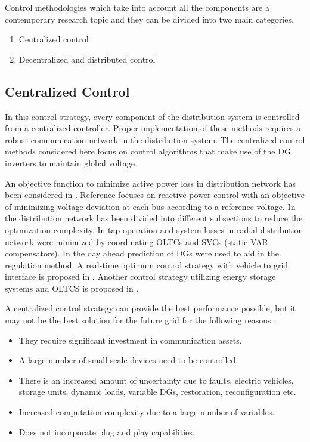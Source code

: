 Control methodologies which take into account all the components are a contemporary research topic and they can be divided into two main categories. 
\begin{enumerate}
    \item Centralized control
    \item Decentralized and distributed control
\end{enumerate}

\subsection{Centralized Control}
In this control strategy, every component of the distribution system is controlled from a centralized controller. Proper implementation of these methods requires a robust communication network in the distribution system. The centralized control methods considered here focus on control algorithms that make use of the DG inverters to maintain global voltage. 

An objective function to minimize active power loss in distribution network has been considered in \cite{CE_VC_1}. Reference \cite{CE_VC_2} focuses on reactive power control with an objective of minimizing voltage deviation at each bus according to a reference voltage. In \cite{CE_VC_3} the distribution network has been divided into different subsections to reduce the optimization complexity. In \cite{CE_VC_4} tap operation and system losses in radial distribution network were minimized by coordinating OLTCs and SVCs (static VAR compensators). In \cite{CE_VC_5} the day ahead prediction of DGs were used to aid in the regulation method. A real-time optimum control strategy with vehicle to grid interface is proposed in \cite{CE_VC_6}. Another control strategy utilizing energy storage systems and OLTCS is proposed in \cite{CE_VC_7}.

A centralized control strategy can provide the best performance possible, but it may not be the best solution for the future grid for the following reasons \cite{VC_1}:
\begin{itemize}
    \item They require significant investment in communication assets.
    \item A large number of small scale devices need to be controlled.
    \item There is an increased amount of uncertainty due to faults, electric vehicles, storage units, dynamic loads, variable DGs, restoration, reconfiguration etc.
    \item Increased computation complexity due to a large number of variables.
    \item Does not incorporate plug and play capabilities.
\end{itemize}

